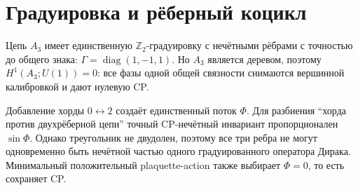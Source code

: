 \section*{Градуировка и рёберный коцикл}

Цепь \(A_3\) имеет единственную \(\mathbb Z_2\)-градуировку с нечётными
рёбрами с точностью до общего знака: \(\Gamma=\operatorname{diag}(1,-1,1)\).
Но \(A_3\) является деревом, поэтому \(H^1(A_3;U(1))=0\): все фазы одной
общей связности снимаются вершинной калибровкой и дают нулевую CP.

Добавление хорды \(0\!\leftrightarrow\!2\) создаёт единственный поток
\(\Phi\). Для разбиения ``хорда против двухрёберной цепи'' точный CP-нечётный
инвариант пропорционален \(\sin\Phi\). Однако треугольник не двудолен, поэтому
все три ребра не могут одновременно быть нечётной частью одного
градуированного оператора Дирака. Минимальный положительный plaquette-action
также выбирает \(\Phi=0\), то есть сохраняет CP.